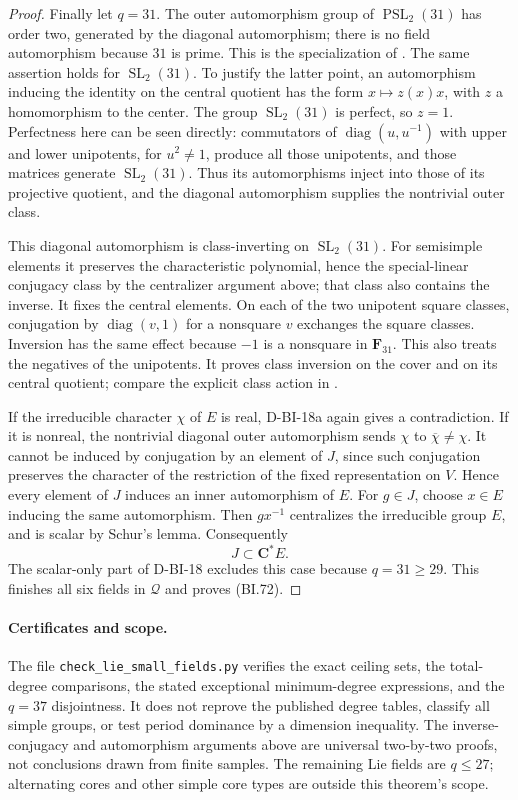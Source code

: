 \begin{proof}
Finally let $q=31$.  The outer automorphism group of
$\operatorname{PSL}_2(31)$ has order two, generated by the
diagonal automorphism; there is no field automorphism because
$31$ is prime.  This is the specialization of
\cite[\S2, p.~3; \S3, p.~6]{BI:WhiteSL2}.  The same assertion
holds for $\operatorname{SL}_2(31)$.  To justify the latter
point, an automorphism inducing the identity on the central
quotient has the form $x\mapsto z(x)x$, with $z$ a homomorphism
to the center.  The group $\operatorname{SL}_2(31)$ is perfect,
so $z=1$.  Perfectness here can be seen directly: commutators of
$\operatorname{diag}(u,u^{-1})$ with upper and lower unipotents,
for $u^2\ne1$, produce all those unipotents, and those matrices
generate $\operatorname{SL}_2(31)$.  Thus its automorphisms
inject into those of its projective quotient, and the diagonal
automorphism supplies the nontrivial outer class.

This diagonal automorphism is class-inverting on
$\operatorname{SL}_2(31)$.  For semisimple elements it preserves
the characteristic polynomial, hence the special-linear conjugacy
class by the centralizer argument above; that class also contains
the inverse.  It fixes the central elements.  On each of the two
unipotent square classes, conjugation by
$\operatorname{diag}(v,1)$ for a nonsquare $v$ exchanges the
square classes.  Inversion has the same effect because $-1$ is a
nonsquare in $\mathbf F_{31}$.  This also treats the negatives
of the unipotents.  It proves class inversion on the cover and on
its central quotient; compare the explicit class action in
\cite[Lemma~3.1, p.~7]{BI:WhiteSL2}.

If the irreducible character $\chi$ of $E$ is real, D-BI-18a
again gives a contradiction.  If it is nonreal, the nontrivial
diagonal outer automorphism sends $\chi$ to
$\overline\chi\ne\chi$.  It cannot be induced by conjugation
by an element of $J$, since such conjugation preserves the
character of the restriction of the fixed representation on $V$.
Hence every element of $J$ induces an inner automorphism of $E$.
For $g\in J$, choose $x\in E$ inducing the same automorphism.
Then $gx^{-1}$ centralizes the irreducible group $E$, and is
scalar by Schur's lemma.  Consequently
\[
                             J\subset\mathbf C^*E.
\]
The scalar-only part of D-BI-18 excludes this case because
$q=31\ge29$.  This finishes all six fields in $\mathcal Q$ and
proves (BI.72).
\end{proof}

\paragraph{Certificates and scope.}
The file \texttt{check\_lie\_small\_fields.py} verifies the exact
ceiling sets, the total-degree comparisons, the stated exceptional
minimum-degree expressions, and the $q=37$ disjointness.  It does
not reprove the published degree tables, classify all simple groups,
or test period dominance by a dimension inequality.  The
inverse-conjugacy and automorphism arguments above are universal
two-by-two proofs, not conclusions drawn from finite samples.
The remaining Lie fields are $q\le27$; alternating cores and
other simple core types are outside this theorem's scope.
